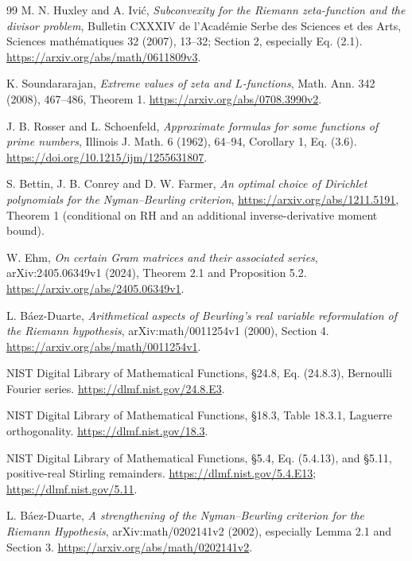 \documentclass[11pt]{article}
\theoremstyle{remark}
\begin{document}
\begin{thebibliography}{99}
M. N. Huxley and A. Ivi\'c,
\emph{Subconvexity for the Riemann zeta-function and the divisor problem},
Bulletin CXXXIV de l'Acad\'emie Serbe des Sciences et des Arts,
Sciences math\'ematiques 32 (2007), 13--32; Section 2, especially Eq. (2.1).
\url{https://arxiv.org/abs/math/0611809v3}.

K. Soundararajan, \emph{Extreme values of zeta and $L$-functions},
Math. Ann. 342 (2008), 467--486, Theorem 1.
\url{https://arxiv.org/abs/0708.3990v2}.


J. B. Rosser and L. Schoenfeld,
\emph{Approximate formulas for some functions of prime numbers},
Illinois J. Math. 6 (1962), 64--94, Corollary 1, Eq. (3.6).
\url{https://doi.org/10.1215/ijm/1255631807}.

S. Bettin, J. B. Conrey and D. W. Farmer,
\emph{An optimal choice of Dirichlet polynomials for the Nyman--Beurling criterion},
\url{https://arxiv.org/abs/1211.5191}, Theorem 1 (conditional on RH and an
additional inverse-derivative moment bound).

W. Ehm, \emph{On certain Gram matrices and their associated series},
arXiv:2405.06349v1 (2024), Theorem 2.1 and Proposition 5.2.
\url{https://arxiv.org/abs/2405.06349v1}.

L. B\'aez-Duarte,
\emph{Arithmetical aspects of Beurling's real variable reformulation
of the Riemann hypothesis}, arXiv:math/0011254v1 (2000), Section 4.
\url{https://arxiv.org/abs/math/0011254v1}.

NIST Digital Library of Mathematical Functions,
\S24.8, Eq. (24.8.3), Bernoulli Fourier series.
\url{https://dlmf.nist.gov/24.8.E3}.

NIST Digital Library of Mathematical Functions,
\S18.3, Table 18.3.1, Laguerre orthogonality.
\url{https://dlmf.nist.gov/18.3}.

NIST Digital Library of Mathematical Functions,
\S5.4, Eq. (5.4.13), and \S5.11, positive-real Stirling remainders.
\url{https://dlmf.nist.gov/5.4.E13}; \url{https://dlmf.nist.gov/5.11}.

L. B\'aez-Duarte,
\emph{A strengthening of the Nyman--Beurling criterion for the Riemann Hypothesis},
arXiv:math/0202141v2 (2002), especially Lemma 2.1 and Section 3.
\url{https://arxiv.org/abs/math/0202141v2}.



\end{thebibliography}
\end{document}
